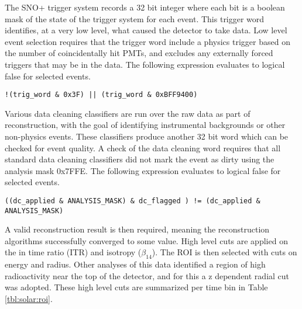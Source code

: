 The SNO+ trigger system records a 32 bit integer where each bit is a boolean mask of the state of the trigger system for each event.
This trigger word identifies, at a very low level, what caused the detector to take data.
Low level event selection requires that the trigger word include a physics trigger based on the number of coincidentally hit PMTs, and excludes any externally forced triggers that may be in the data.
The following expression evaluates to logical false for selected events.

\begin{verbatim}
!(trig_word & 0x3F) || (trig_word & 0xBFF9400)
\end{verbatim}

Various data cleaning classifiers are run over the raw data as part of reconstruction, with the goal of identifying instrumental backgrounds or other non-physics events.
These classifiers produce another 32 bit word which can be checked for event quality.
A check of the data cleaning word requires that all standard data cleaning classifiers did not mark the event as dirty using the analysis mask 0x7FFE.
The following expression evaluates to logical false for selected events.

\begin{verbatim}
((dc_applied & ANALYSIS_MASK) & dc_flagged ) != (dc_applied & ANALYSIS_MASK)
\end{verbatim}

A valid reconstruction result is then required, meaning the reconstruction algorithms successfully converged to some value.
High level cuts are applied on the in time ratio (ITR) and isotropy ($\beta_{14}$).
The ROI is then selected with cuts on energy and radius.
Other analyses of this data identified a region of high radioactivity near the top of the detector, and for this a z dependent radial cut was adopted.
These high level cuts are summarized per time bin in Table \ref{tbl:solar:roi}.

